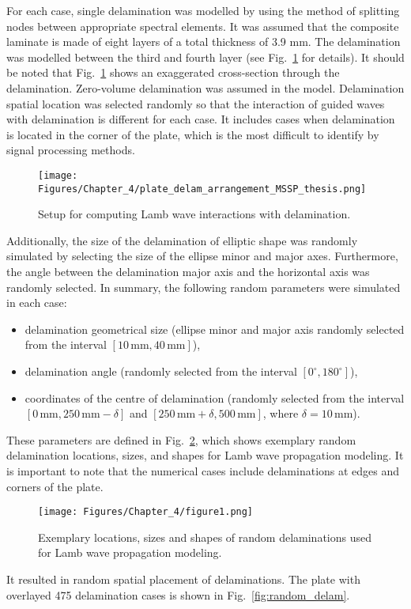 For each case, single delamination was modelled by using the method of splitting nodes between appropriate spectral elements. 
It was assumed that the composite laminate is made of eight layers of a total thickness of 3.9 mm.
The delamination was modelled between the third and fourth layer (see Fig.~\ref{fig:plate_setup} for details).
It should be noted that Fig.~\ref{fig:plate_setup} shows an exaggerated cross-section through the delamination. 
Zero-volume delamination was assumed in the model. 
Delamination spatial location was selected randomly so that the interaction of guided waves with delamination is different for each case.
It includes cases when delamination is located in the corner of the plate, which is the most difficult to identify by signal processing methods.
\begin{figure}
	\centering
	\texttt{[image: Figures/Chapter\_4/plate\_delam\_arrangement\_MSSP\_thesis.png]}
	\caption{Setup for computing Lamb wave interactions with delamination.}
	\label{fig:plate_setup}
\end{figure}
Additionally, the size of the delamination of elliptic shape was randomly simulated by selecting the size of the ellipse minor and major axes.
Furthermore, the angle between the delamination major axis and the horizontal axis was randomly selected.
In summary, the following random parameters were simulated in each case:
\begin{itemize}
	\item delamination geometrical size	(ellipse minor and major axis randomly selected from the interval \(\left[10 \, \textrm{mm}, 40\, \textrm{mm}\right]\)),
	\item delamination angle (randomly selected from the interval \( \left[ 0^{\circ}, 180^{\circ} \right]\)),
	\item coordinates of the centre of delamination (randomly selected from the interval \(\left[0\, \textrm{mm}, 250\, \textrm{mm} -\delta \right]\) and \( \left[250\, \textrm{mm}+\delta, 500\, \textrm{mm} \right] \), where \(\delta = 10\, \textrm{mm}\)).
\end{itemize}
These parameters are defined in Fig.~\ref{fig:random_delaminations}, which shows exemplary random delamination locations, sizes, and shapes for Lamb wave propagation modeling.
It is important to note that the numerical cases include delaminations at edges and corners of the plate.
\begin{figure}[!htb]
	\centering
	\texttt{[image: Figures/Chapter\_4/figure1.png]}
	\caption{Exemplary locations, sizes and shapes of random delaminations used for Lamb wave propagation modeling.}
	\label{fig:random_delaminations}
\end{figure}
It resulted in random spatial placement of delaminations. The plate with overlayed 475 delamination cases is shown in Fig.~\ref{fig:random_delam}.

